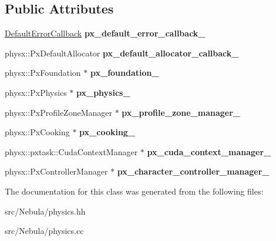 \subsection*{\-Public \-Attributes}
\begin{DoxyCompactItemize}
\item 
\hypertarget{classNeb_1_1physics_a94f4acbaaa5742c633007fd6b3819c5b}{\hyperlink{classDefaultErrorCallback}{\-Default\-Error\-Callback} {\bfseries px\-\_\-default\-\_\-error\-\_\-callback\-\_\-}}\label{classNeb_1_1physics_a94f4acbaaa5742c633007fd6b3819c5b}

\item 
\hypertarget{classNeb_1_1physics_a0415a6eb0242881540994bd7a667e32c}{physx\-::\-Px\-Default\-Allocator {\bfseries px\-\_\-default\-\_\-allocator\-\_\-callback\-\_\-}}\label{classNeb_1_1physics_a0415a6eb0242881540994bd7a667e32c}

\item 
\hypertarget{classNeb_1_1physics_ad10a620fe6052b1db0fad0ed97d52ebb}{physx\-::\-Px\-Foundation $\ast$ {\bfseries px\-\_\-foundation\-\_\-}}\label{classNeb_1_1physics_ad10a620fe6052b1db0fad0ed97d52ebb}

\item 
\hypertarget{classNeb_1_1physics_ab98dfdf9b8671f794f6f5811e4f1319a}{physx\-::\-Px\-Physics $\ast$ {\bfseries px\-\_\-physics\-\_\-}}\label{classNeb_1_1physics_ab98dfdf9b8671f794f6f5811e4f1319a}

\item 
\hypertarget{classNeb_1_1physics_a0fad63bf6306306fb22d3f58560d1c11}{physx\-::\-Px\-Profile\-Zone\-Manager $\ast$ {\bfseries px\-\_\-profile\-\_\-zone\-\_\-manager\-\_\-}}\label{classNeb_1_1physics_a0fad63bf6306306fb22d3f58560d1c11}

\item 
\hypertarget{classNeb_1_1physics_a041b8e5a85614606bc821d4a8d5d88d2}{physx\-::\-Px\-Cooking $\ast$ {\bfseries px\-\_\-cooking\-\_\-}}\label{classNeb_1_1physics_a041b8e5a85614606bc821d4a8d5d88d2}

\item 
\hypertarget{classNeb_1_1physics_a1292b571e26510adef2bd316797071c0}{physx\-::pxtask\-::\-Cuda\-Context\-Manager $\ast$ {\bfseries px\-\_\-cuda\-\_\-context\-\_\-manager\-\_\-}}\label{classNeb_1_1physics_a1292b571e26510adef2bd316797071c0}

\item 
\hypertarget{classNeb_1_1physics_aa3c2db56b039c1380242e968de69250f}{physx\-::\-Px\-Controller\-Manager $\ast$ {\bfseries px\-\_\-character\-\_\-controller\-\_\-manager\-\_\-}}\label{classNeb_1_1physics_aa3c2db56b039c1380242e968de69250f}

\end{DoxyCompactItemize}


\-The documentation for this class was generated from the following files\-:\begin{DoxyCompactItemize}
\item 
src/\-Nebula/physics.\-hh\item 
src/\-Nebula/physics.\-cc\end{DoxyCompactItemize}
